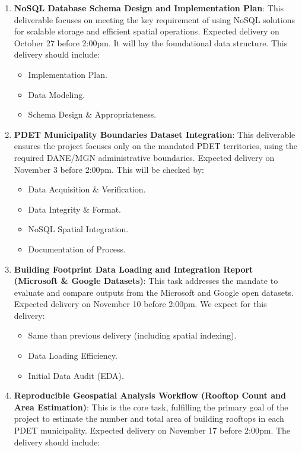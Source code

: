 \documentclass[12pt]{article}
\begin{document}
\begin{enumerate}
  \item \textbf{NoSQL Database Schema Design and Implementation Plan}:
  This deliverable focuses on meeting the key requirement of using NoSQL solutions for scalable storage and efficient spatial operations.
  Expected delivery on October 27 before 2:00pm. It will lay the foundational data structure.
  This delivery should include:

  \begin{itemize}
    \item Implementation Plan.
    \item Data Modeling.
    \item Schema Design \& Appropriateness.
  \end{itemize}

  \item \textbf{PDET Municipality Boundaries Dataset Integration}: This deliverable ensures the project focuses only on the mandated PDET territories, using the required DANE/MGN administrative boundaries. Expected delivery on November 3 before 2:00pm. This will be checked by:

  \begin{itemize}
    \item Data Acquisition \& Verification.
    \item Data Integrity \& Format.
    \item NoSQL Spatial Integration.
    \item Documentation of Process.
  \end{itemize}

  \item \textbf{Building Footprint Data Loading and Integration Report (Microsoft \& Google Datasets)}:
  This task addresses the mandate to evaluate and compare outputs from the Microsoft and Google open datasets. Expected delivery on November 10 before 2:00pm. We expect for this delivery:

  \begin{itemize}
    \item Same than previous delivery (including spatial indexing).
    \item Data Loading Efficiency.
    \item Initial Data Audit (EDA).
  \end{itemize}

  \item \textbf{Reproducible Geospatial Analysis Workflow (Rooftop Count and Area Estimation)}: This is the core task, fulfilling the primary goal of the project to estimate the number and total area of building rooftops in each PDET municipality. Expected delivery on November 17 before 2:00pm. The delivery should include:


\end{enumerate}
\end{document}
